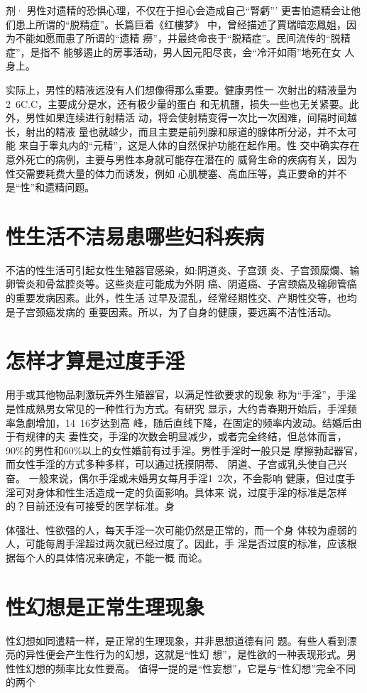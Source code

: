 \documentclass[12pt,UTF8]{ctexbook}
\begin{document}
剂·
男性对遗精的恐惧心理，不仅在于担心会造成自己“腎虧”’
更害怕遗精会让他们患上所谓的“脱精症”。长篇巨着《红樓梦》
中，曾经描述了賈瑞暗恋鳳姐，因为不能如愿而患了所谓的“遗精
癆”，并最终命丧于“脱精症”。民间流传的“脱精症”，是指不
能够遏止的房事活动，男人因元阳尽丧，会“冷汗如雨”地死在女
人身上。

实际上，男性的精液远没有人们想像得那么重要。健康男性一
次射出的精液量为2~6C.C，主要成分是水，还有极少量的蛋白
和无机鹽，损失一些也无关紧要。此外，男性如果连续进行射精活
动，将会使射精变得一次比一次困难，间隔时间越长，射出的精液
量也就越少，而且主要是前列腺和尿道的腺体所分泌，并不太可能
来自于睾丸内的“元精”，这是人体的自然保护功能在起作用。性
交中确实存在意外死亡的病例，主要与男性本身就可能存在潜在的
威脅生命的疾病有关，因为性交需要耗费大量的体力而诱发，例如
心肌梗塞、高血压等，真正要命的并不是“性”和遗精问题。

\section{性生活不洁易患哪些妇科疾病}

不洁的性生活可引起女性生殖器官感染，如:阴道炎、子宫颈
炎、子宫颈糜爛、输卵管炎和骨盆腔炎等。这些炎症可能成为外阴
癌、阴道癌、子宫颈癌及输卵管癌的重要发病因素。此外，性生活
过早及混乱，经常经期性交、产期性交等，也均是子宫颈癌发病的
重要因素。所以，为了自身的健康，要远离不洁性活动。

\section{怎样才算是过度手淫}

用手或其他物品刺激玩弄外生殖器官，以满足性欲要求的现象
称为“手淫”，手淫是性成熟男女常见的一种性行为方式。有研究
显示，大约青春期开始后，手淫频率急劇增加，14~16岁达到高
峰，随后直线下降，在固定的频率内波动。结婚后由于有规律的夫
妻性交，手淫的次数会明显减少，或者完全终结，但总体而言，
90\%的男性和60\%以上的女性婚前有过手淫。男性手淫时一般只是
摩擦勃起器官，而女性手淫的方式多种多样，可以通过抚摸阴蒂、
阴道、子宫或乳头使自己兴奋。
一般来说，偶尔手淫或未婚男女每月手淫1~2次，不会影响
健康，但过度手淫可对身体和性生活造成一定的负面影响。具体来
说，过度手淫的标准是怎样的？目前还没有可接受的医学标准。身

体强壮、性欲强的人，每天手淫一次可能仍然是正常的，而一个身
体较为虛弱的人，可能每周手淫超过两次就已经过度了。因此，手
淫是否过度的标准，应该根据每个人的具体情况来确定，不能一概
而论。
\section{性幻想是正常生理现象}
性幻想如同遣精一样，是正常的生理现象，并非思想道德有问
题。有些人看到漂亮的异性便会产生性行为的幻想，这就是“性幻
想”，是性欲的一种表现形式。男性性幻想的频率比女性要高。
值得一提的是“性妄想”，它是与“性幻想”完全不同的两个
\end{document}
